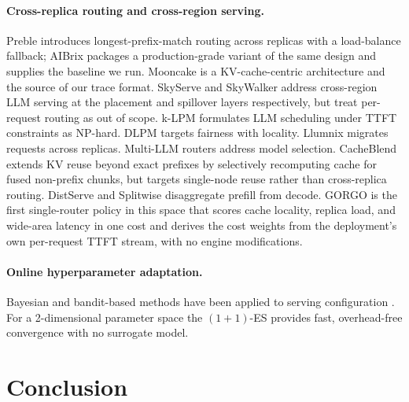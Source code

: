 \documentclass{article}
\begin{document}
\paragraph{Cross-replica routing and cross-region serving.}
Preble \citep{preble} introduces longest-prefix-match routing across replicas
with a load-balance fallback; AIBrix \citep{aibrix2024} packages a
production-grade variant of the same design and supplies the baseline we run.
Mooncake \citep{qin2024mooncake} is a KV-cache-centric architecture and the
source of our trace format. SkyServe \citep{skyserve} and SkyWalker
\citep{skywalker} address cross-region LLM serving at the placement and
spillover layers respectively, but treat per-request routing as out of scope.
k-LPM \citep{klpm2025} formulates LLM scheduling under TTFT constraints as
NP-hard. DLPM \citep{dlpm2025} targets fairness with locality. Llumnix
\citep{llumnix2024} migrates requests across replicas. Multi-LLM routers
\citep{routerwu2025} address model selection. CacheBlend
\citep{yao2024cacheblend} extends KV reuse beyond exact prefixes by selectively
recomputing cache for fused non-prefix chunks, but targets single-node reuse
rather than cross-replica routing. DistServe \citep{distserve2024} and Splitwise
\citep{splitwise2024} disaggregate prefill from decode. GORGO is the first
single-router policy in this space that scores cache locality, replica load,
and wide-area latency in one cost and derives the cost weights from the
deployment's own per-request TTFT stream, with no engine modifications.

\paragraph{Online hyperparameter adaptation.}
Bayesian and bandit-based methods have been applied to serving configuration
\citep{routerwu2025}. For a 2-dimensional parameter space the $(1{+}1)$-ES
\citep{rechenberg1973} provides fast, overhead-free convergence with no
surrogate model.

\section{Conclusion}
\label{sec:conclusion}
\end{document}
